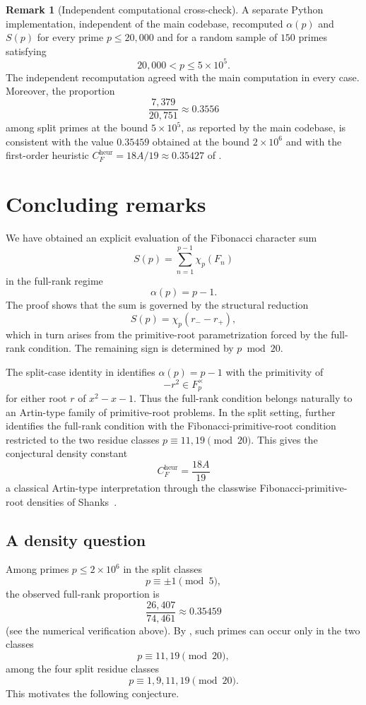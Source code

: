 \documentclass[preprint,12pt]{elsarticle}
\def\F{F}%
\numberwithin{equation}{section}
\theoremstyle{plain}
\theoremstyle{definition}
\newtheorem{remark}[theorem]{Remark}
\newcommand{\F}{\mathbb{F}}
\begin{document}
\begin{remark}[Independent computational cross-check]
\label{rem:independent-cross-check}
A separate Python implementation, independent of the main codebase,
recomputed $\alpha(p)$ and $S(p)$ for every prime $p\le20{,}000$ and
for a random sample of $150$ primes satisfying
\[
20{,}000<p\le5\times10^5.
\]
The independent recomputation agreed with the main computation in
every case. Moreover, the proportion
\[
\frac{7{,}379}{20{,}751}\approx0.3556
\]
among split primes at the bound $5\times10^5$, as reported by the
main codebase, is consistent with the value $0.35459$ obtained at the
bound $2\times10^6$ and with the first-order heuristic
$C_F^{\mathrm{heur}}=18A/19\approx0.35427$ of
.
\end{remark}
 
\section{Concluding remarks}\label{sec:conclusion}
 
We have obtained an explicit evaluation of the Fibonacci character
sum
\[
S(p)=\sum_{n=1}^{p-1}\chi_p(F_n)
\]
in the full-rank regime
\[
\alpha(p)=p-1.
\]
The proof shows that the sum is governed by the structural reduction
\[
S(p)=\chi_p(r_--r_+),
\]
which in turn arises from the primitive-root parametrization forced by
the full-rank condition. The remaining sign is determined by
$p\bmod 20$.
 
The split-case identity in  identifies
$\alpha(p)=p-1$ with the primitivity of
\[
-r^2\in\F_p^\times
\]
for either root $r$ of $x^2-x-1$. Thus the full-rank condition belongs
naturally to an Artin-type family of primitive-root problems.
In the split setting,  further
identifies the full-rank condition with the Fibonacci-primitive-root
condition restricted to the two residue classes
$p\equiv11,19\pmod{20}$. This gives the conjectural density constant
\[
C_F^{\mathrm{heur}}=\frac{18A}{19}
\]
a classical Artin-type interpretation through the classwise
Fibonacci-primitive-root densities of Shanks~\cite{Shanks1972}.
 
\subsection*{A density question}
 
Among primes $p\le2\times10^6$ in the split classes
\[
p\equiv\pm1\pmod5,
\]
the observed full-rank proportion is
\[
\frac{26{,}407}{74{,}461}\approx0.35459
\]
(see the numerical verification above). By , such
primes can occur only in the two classes
\[
p\equiv11,19\pmod{20},
\]
among the four split residue classes
\[
p\equiv1,9,11,19\pmod{20}.
\]
This motivates the following conjecture.
 
\end{document}
